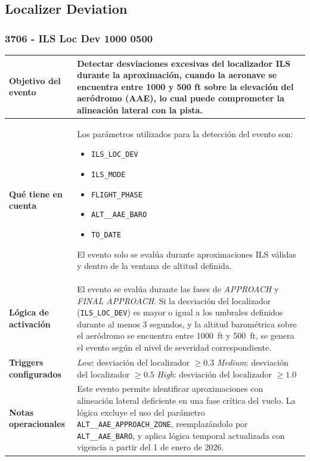 \documentclass[11pt,a4paper]{article}
\begin{document}
	\subsection{Localizer Deviation}
	
	\subsubsection{3706 - ILS Loc Dev 1000 0500}
	
	\renewcommand{\arraystretch}{1.3}
	\begin{longtable}{p{5cm} p{9.5cm}}
		\hline
		\textbf{Objetivo del evento} &
		Detectar desviaciones excesivas del localizador ILS durante la aproximación, cuando la aeronave se encuentra entre 1000 y 500 ft sobre la elevación del aeródromo (AAE), lo cual puede comprometer la alineación lateral con la pista. \\
		\hline
		\textbf{Qué tiene en cuenta} &
		Los parámetros utilizados para la detección del evento son:
		\begin{itemize}
			\item \texttt{ILS\_LOC\_DEV}
			\item \texttt{ILS\_MODE}
			\item \texttt{FLIGHT\_PHASE}
			\item \texttt{ALT\_\_AAE\_BARO}
			\item \texttt{TO\_DATE}
		\end{itemize}
		El evento solo se evalúa durante aproximaciones ILS válidas y dentro de la ventana de altitud definida. \\
		\hline
		\textbf{Lógica de activación} &
		El evento se evalúa durante las fases de \textit{APPROACH} y \textit{FINAL APPROACH}.  
		Si la desviación del localizador (\texttt{ILS\_LOC\_DEV}) es mayor o igual a los umbrales definidos durante al menos 3 segundos, y la altitud barométrica sobre el aeródromo se encuentra entre \SI{1000}{ft} y \SI{500}{ft}, se genera el evento según el nivel de severidad correspondiente. \\
		\hline
		\textbf{Triggers configurados} &
		\textit{Low}: desviación del localizador $\geq 0.3$ \newline
		\textit{Medium}: desviación del localizador $\geq 0.5$ \newline
		\textit{High}: desviación del localizador $\geq 1.0$ \\
		\hline
		\textbf{Notas operacionales} &
		Este evento permite identificar aproximaciones con alineación lateral deficiente en una fase crítica del vuelo.  
		La lógica excluye el uso del parámetro \texttt{ALT\_\_AAE\_APPROACH\_ZONE}, reemplazándolo por \texttt{ALT\_\_AAE\_BARO}, y aplica lógica temporal actualizada con vigencia a partir del 1 de enero de 2026. \\
		\hline
	\end{longtable} \newpage
	
\end{document}

